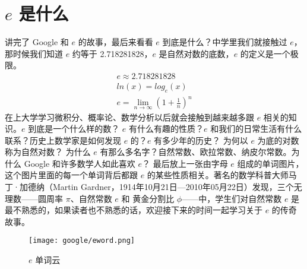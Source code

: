 \section{$e$ 是什么}
讲完了 Google 和 $e$ 的故事，最后来看看 $e$ 到底是什么？中学里我们就接触过 $e$，那时候我们知道 $e$ 约等于 2.718281828，$e$ 是自然对数的底数，$e$ 的定义是一个极限。
\begin{equation}
\nonumber
\begin{split}
e \approx 2.718281828 \\
ln(x) = log_{e}(x) \\
e = \lim_{n \to \infty}(1+\frac{1}{n})^n
\end{split}
\end{equation}
在上大学学习微积分、概率论、数学分析以后就会接触到越来越多跟 $e$ 相关的知识。$e$ 到底是一个什么样的数？ $e$ 有什么有趣的性质？$e$ 和我们的日常生活有什么联系？历史上数学家是如何发现 $e$ 的？$e$ 有多少年的历史？ 为何以 $e$ 为底的对数称为自然对数？ 为什么 $e$ 有那么多名字？自然常数、欧拉常数、纳皮尔常数。为什么 Google 和许多数学人如此喜欢 $e$？
最后放上一张由字母 $e$ 组成的单词图片，这个图片里面的每一个单词背后都跟 $e$ 的某些性质相关。著名的数学科普大师马丁·加德纳（Martin Gardner，1914年10月21日—2010年05月22日）发现，三个无理数——圆周率 $\pi$、自然常数 $e$ 和 黄金分割比 $\phi$——中，学生们对自然常数 $e$ 是最不熟悉的，如果读者也不熟悉的话，欢迎接下来的时间一起学习关于 $e$ 的传奇故事。
\begin{figure}[htbp]
\centering
\texttt{[image: google/eword.png]}
\caption{$e$ 单词云}
\centering
\end{figure}


